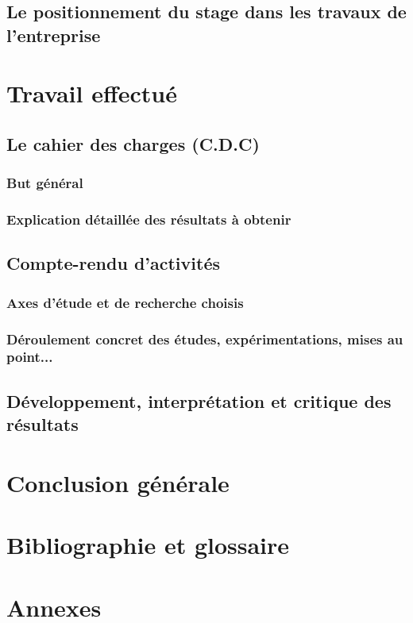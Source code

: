 \documentclass[12pt,a4paper]{report}
\begin{document}
\section{Le positionnement du stage dans les travaux de l'entreprise}

\chapter{Travail effectué}
\section{Le cahier des charges (C.D.C)}
\subsection{But général}
\subsection{Explication détaillée des résultats à obtenir}

\section{Compte-rendu d'activités}
\subsection{Axes d'étude et de recherche choisis}
\subsection{Déroulement concret des études, expérimentations, mises au point...}

\section{Développement, interprétation et critique des résultats}

\chapter{Conclusion générale}

\chapter{Bibliographie et glossaire}
\begin{thebibliography}{99}
\end{thebibliography}

\chapter{Annexes}
\end{document}

